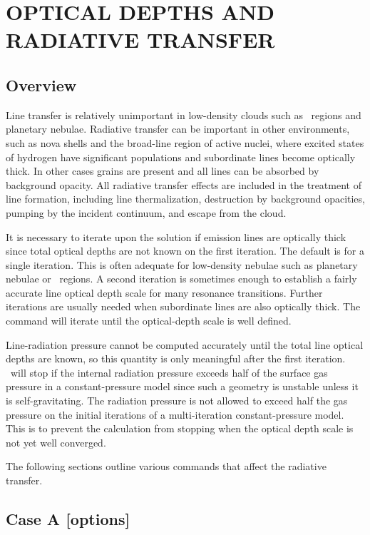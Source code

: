 \chapter{OPTICAL DEPTHS AND RADIATIVE TRANSFER}

\section{Overview}

Line transfer is relatively unimportant in
low-density clouds such as \hii\ regions
and planetary nebulae.
Radiative transfer can be important in other
environments,
such as nova shells and the broad-line region of active nuclei,
where excited states of hydrogen have significant
populations and subordinate
lines become optically thick.
In other cases grains are present and all
lines can be absorbed by background opacity.
All radiative transfer effects
are included in the treatment of line formation,
including line thermalization,
destruction by background opacities, pumping by the incident continuum,
and escape from the cloud.

It is necessary to iterate upon the solution if emission lines are
optically thick since total optical depths are not known on the first
iteration.
The default is for a single iteration.
This is
often adequate for low-density nebulae such as planetary nebulae or \hii\ regions.
A second iteration is sometimes enough to establish a fairly
accurate line optical depth scale for many resonance transitions.
Further
iterations are usually needed when subordinate lines are also optically
thick.
The  command
will iterate until the optical-depth scale is well defined.

Line-radiation pressure cannot be computed accurately until the total
line optical depths are known,
so this quantity is only meaningful after
the first iteration.
\Cloudy\ will stop if the internal radiation pressure
exceeds half of the surface gas pressure in a constant-pressure
model since
such a geometry is unstable unless it is self-gravitating.
The radiation
pressure is not allowed to exceed half the gas pressure on the initial
iterations of a multi-iteration constant-pressure model.
This is to prevent
the calculation from stopping when the optical depth scale is
not yet well converged.

The following sections outline various commands that affect the
radiative transfer.

\section{Case A [options]}

